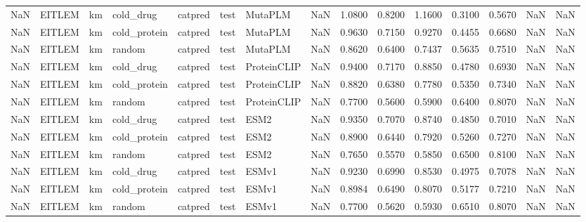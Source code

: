 \begin{tabular}{rlllllllrrrrrrr}
NaN & EITLEM & km & cold_drug & catpred & test & MutaPLM & NaN & 1.0800 & 0.8200 & 1.1600 & 0.3100 & 0.5670 & NaN & NaN \\
NaN & EITLEM & km & cold_protein & catpred & test & MutaPLM & NaN & 0.9630 & 0.7150 & 0.9270 & 0.4455 & 0.6680 & NaN & NaN \\
NaN & EITLEM & km & random & catpred & test & MutaPLM & NaN & 0.8620 & 0.6400 & 0.7437 & 0.5635 & 0.7510 & NaN & NaN \\
NaN & EITLEM & km & cold_drug & catpred & test & ProteinCLIP & NaN & 0.9400 & 0.7170 & 0.8850 & 0.4780 & 0.6930 & NaN & NaN \\
NaN & EITLEM & km & cold_protein & catpred & test & ProteinCLIP & NaN & 0.8820 & 0.6380 & 0.7780 & 0.5350 & 0.7340 & NaN & NaN \\
NaN & EITLEM & km & random & catpred & test & ProteinCLIP & NaN & 0.7700 & 0.5600 & 0.5900 & 0.6400 & 0.8070 & NaN & NaN \\
NaN & EITLEM & km & cold_drug & catpred & test & ESM2 & NaN & 0.9350 & 0.7070 & 0.8740 & 0.4850 & 0.7010 & NaN & NaN \\
NaN & EITLEM & km & cold_protein & catpred & test & ESM2 & NaN & 0.8900 & 0.6440 & 0.7920 & 0.5260 & 0.7270 & NaN & NaN \\
NaN & EITLEM & km & random & catpred & test & ESM2 & NaN & 0.7650 & 0.5570 & 0.5850 & 0.6500 & 0.8100 & NaN & NaN \\
NaN & EITLEM & km & cold_drug & catpred & test & ESMv1 & NaN & 0.9230 & 0.6990 & 0.8530 & 0.4975 & 0.7078 & NaN & NaN \\
NaN & EITLEM & km & cold_protein & catpred & test & ESMv1 & NaN & 0.8984 & 0.6490 & 0.8070 & 0.5177 & 0.7210 & NaN & NaN \\
NaN & EITLEM & km & random & catpred & test & ESMv1 & NaN & 0.7700 & 0.5620 & 0.5930 & 0.6510 & 0.8070 & NaN & NaN \\
\bottomrule
\end{tabular}
